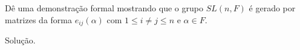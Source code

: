 \begin{homeworkProblem}
  Dê uma demonstração formal mostrando que o grupo $SL(n,F)$ é gerado por matrizes da forma $e_{ij}(\alpha)$ com $1 \leq i \neq j \leq n$ e $\alpha \in F$.
  \begin{solution}
    Solução.
  \end{solution}
\end{homeworkProblem}
